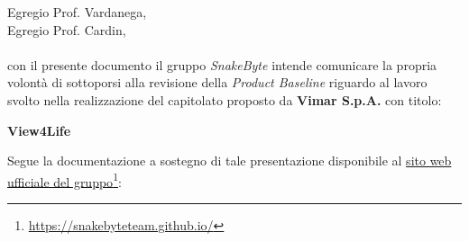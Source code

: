 \documentclass[10pt, letterpaper]{article}
\begin{document}
\noindent 
Egregio Prof. Vardanega, \\
Egregio Prof. Cardin, \\
\\
con il presente documento il gruppo \textit{SnakeByte} intende comunicare la propria volontà di sottoporsi alla revisione della \textit{Product Baseline} riguardo al lavoro svolto nella realizzazione del capitolato proposto da \textbf{Vimar S.p.A.} con titolo: 
\begin{center}
    \textbf{View4Life}
\end{center}
Segue la documentazione a sostegno di tale presentazione disponibile al \href{https://snakebyteteam.github.io/}{sito web ufficiale del gruppo}\footnote{\href{https://snakebyteteam.github.io/}{https://snakebyteteam.github.io/}}:
\end{document}
